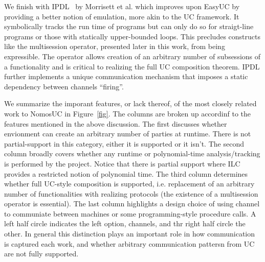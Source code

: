 We finish with IPDL~\cite{ipdl} by Morrisett et al. which improves upon EasyUC by providing a better notion of emulation, more akin to the UC framework.
It symbolically tracks the run time of programs but can only do so for straigt-line programs or those with statically upper-bounded loops.
This precludes constructs like the multisession operator, presented later in this work, from being expressible. 
The operator allows creation of an arbitrary number of subsessions of a functionality and is critical to realizing the full UC composition theorem.
IPDL further implements a unique communication mechanism that imposes a static dependency between channels ``firing''.

We summarize the imporant features, or lack thereof, of the most closely related work to NomosUC in Figure~\ref{fig}.
The columns are broken up accordinf to the features mentioned in the above discussion.
The first discusses whether envionment can create an arbitrary number of parties at runtime. There is not partial-support in this category, either it is supported or it isn't.
The second column broadly covers whether any runtime or polynomial-time analysis/tracking is performed by the project. Notice that there is partial support where ILC provides a restricted notion of polynomial time.
The third column determines whether full UC-style composition is supported, i.e. replacement of an arbitrary number of functionalities with realizing protocols (the existence of a multisession operator is essential). 
The last column highlights a design choice of using channel to communiate between machines or some programming-style procedure calls.
A left half circle indicates the left option, channels, and thr right half circle the other. 
In general this distinction plays an important role in how communication is captured each work, and whether arbitrary communication pattersn from UC are not fully supported.

